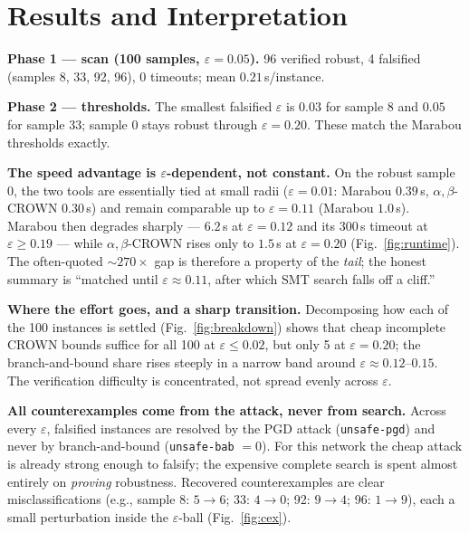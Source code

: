 \documentclass[10pt]{article}
\newcommand{\abc}{$\alpha,\beta$-CROWN}
\newcommand{\eps}{$\varepsilon$}
\begin{document}
\section{Results and Interpretation}
\textbf{Phase 1 --- scan (100 samples, $\varepsilon=0.05$).} 96 verified robust, 4 falsified
(samples 8, 33, 92, 96), 0 timeouts; mean $0.21$\,s/instance.

\textbf{Phase 2 --- thresholds.} The smallest falsified \eps{} is $0.03$ for sample 8 and
$0.05$ for sample 33; sample 0 stays robust through $\varepsilon=0.20$. These match the
Marabou thresholds exactly.

\textbf{The speed advantage is \eps{}-dependent, not constant.} On the robust sample 0, the
two tools are essentially tied at small radii ($\varepsilon=0.01$: Marabou $0.39$\,s, \abc{}
$0.30$\,s) and remain comparable up to $\varepsilon=0.11$ (Marabou $1.0$\,s). Marabou then
degrades sharply --- $6.2$\,s at $\varepsilon=0.12$ and its $300$\,s timeout at
$\varepsilon\ge0.19$ --- while \abc{} rises only to $1.5$\,s at $\varepsilon=0.20$
(Fig.~\ref{fig:runtime}). The often-quoted ${\sim}270\times$ gap is therefore a property of
the \emph{tail}; the honest summary is ``matched until $\varepsilon\approx0.11$, after which
SMT search falls off a cliff.''

\textbf{Where the effort goes, and a sharp transition.} Decomposing how each of the 100
instances is settled (Fig.~\ref{fig:breakdown}) shows that cheap incomplete CROWN bounds
suffice for all 100 at $\varepsilon\le0.02$, but only 5 at $\varepsilon=0.20$; the
branch-and-bound share rises steeply in a narrow band around $\varepsilon\approx0.12$--$0.15$.
The verification difficulty is concentrated, not spread evenly across \eps{}.

\textbf{All counterexamples come from the attack, never from search.} Across every \eps{},
falsified instances are resolved by the PGD attack (\texttt{unsafe-pgd}) and never by
branch-and-bound (\texttt{unsafe-bab} $=0$). For this network the cheap attack is already
strong enough to falsify; the expensive complete search is spent almost entirely on
\emph{proving} robustness. Recovered counterexamples are clear misclassifications (e.g.,
sample 8: $5\!\to\!6$; 33: $4\!\to\!0$; 92: $9\!\to\!4$; 96: $1\!\to\!9$), each a small
perturbation inside the \eps{}-ball (Fig.~\ref{fig:cex}).
\end{document}
